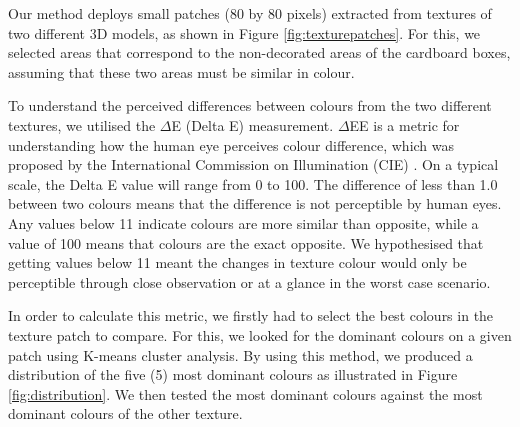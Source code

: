 \documentclass[acmlarge,screen,dvipsnames]{acmart}
\begin{document}
Our method deploys small patches (80 by 80 pixels) extracted from
textures of two different 3D models, as shown in Figure
\ref{fig:texturepatches}. For this, we selected areas that correspond to the
non-decorated areas of the cardboard boxes, assuming that these two areas
must be similar in colour. 


To understand the perceived differences between colours from the two different textures, we utilised the $\Delta$E (Delta E) measurement. $\Delta$EE is a metric for understanding how the human eye perceives
colour difference, which was proposed by the International Commission on
Illumination (CIE) \cite{cie2020}. On a typical scale, the Delta E value will range
from 0 to 100. The difference of less than 1.0 between two colours means
that the difference is not perceptible by human eyes. Any values below
11 indicate colours are more similar than opposite, while a value of 100
means that colours are the exact opposite. We hypothesised that getting
values below 11 meant the changes in texture colour would only be
perceptible through close observation or at a glance in the worst
case scenario.

In order to calculate this metric, we firstly had to select the best
colours in the texture patch to compare. For this, we looked for the
dominant colours on a given patch using K-means cluster analysis. By
using this method, we produced a distribution of the five (5) most dominant
colours as illustrated in Figure \ref{fig:distribution}. We then tested
the most dominant colours against the most dominant colours of the other
texture.
\end{document}
